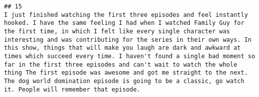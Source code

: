 \documentclass[
]{article}
\begin{document}
\begin{verbatim}
## 15                                                                                                                                                                                                                                                                                                                                                                                                                                                                                                                                                                                                                                                                                                                                                                                                                                                                                                                                                                                                                                                                                                                                                                                                                                                                                                                                                                                                                                                                                                                                                                                                                                                                                                                                                                          I just finished watching the first three episodes and feel instantly hooked. I have the same feeling I had when I watched Family Guy for the first time, in which I felt like every single character was interesting and was contributing for the series in their own ways. In this show, things that will make you laugh are dark and awkward at times which succeed every time. I haven't found a single bad moment so far in the first three episodes and can't wait to watch the whole thing The first episode was awesome and got me straight to the next. The dog world domination episode is going to be a classic, go watch it. People will remember that episode.

\end{verbatim}
\end{document}
